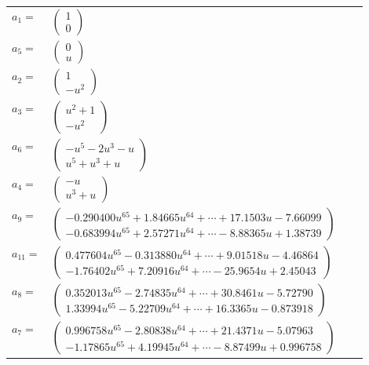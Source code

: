 \documentclass[1p]{elsarticle_modified}
\theoremstyle{definition}
\begin{document}
\begin{tabular}{m{7pt} m{180pt} m{7pt} m{180pt} }
\flushright $a_{1}=$&$\begin{pmatrix}1\\0\end{pmatrix}$ \\
\flushright $a_{5}=$&$\begin{pmatrix}0\\u\end{pmatrix}$ \\
\flushright $a_{2}=$&$\begin{pmatrix}1\\- u^2\end{pmatrix}$ \\
\flushright $a_{3}=$&$\begin{pmatrix}u^2+1\\- u^2\end{pmatrix}$ \\
\flushright $a_{6}=$&$\begin{pmatrix}- u^5-2 u^3- u\\u^5+u^3+u\end{pmatrix}$ \\
\flushright $a_{4}=$&$\begin{pmatrix}- u\\u^3+u\end{pmatrix}$ \\
\flushright $a_{9}=$&$\begin{pmatrix}-0.290400 u^{65}+1.84665 u^{64}+\cdots+17.1503 u-7.66099\\-0.683994 u^{65}+2.57271 u^{64}+\cdots-8.88365 u+1.38739\end{pmatrix}$ \\
\flushright $a_{11}=$&$\begin{pmatrix}0.477604 u^{65}-0.313880 u^{64}+\cdots+9.01518 u-4.46864\\-1.76402 u^{65}+7.20916 u^{64}+\cdots-25.9654 u+2.45043\end{pmatrix}$ \\
\flushright $a_{8}=$&$\begin{pmatrix}0.352013 u^{65}-2.74835 u^{64}+\cdots+30.8461 u-5.72790\\1.33994 u^{65}-5.22709 u^{64}+\cdots+16.3365 u-0.873918\end{pmatrix}$ \\
\flushright $a_{7}=$&$\begin{pmatrix}0.996758 u^{65}-2.80838 u^{64}+\cdots+21.4371 u-5.07963\\-1.17865 u^{65}+4.19945 u^{64}+\cdots-8.87499 u+0.996758\end{pmatrix}$ \\

\end{tabular}
\end{document}
